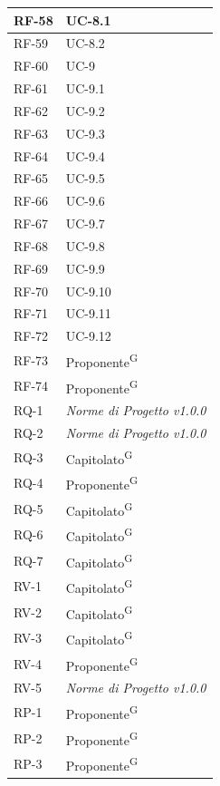 \documentclass[8pt]{article}
\newcommand{\glossterm}[1]{#1\textsuperscript{G}} %
\begin{document}
\begin{longtable}{|>{\centering\arraybackslash}p{4cm}|>{\centering\arraybackslash}p{4cm}|}
            RF-58 & UC-8.1 \\ \hline
            RF-59 & UC-8.2 \\ \hline
            RF-60 & UC-9 \\ \hline
            RF-61 & UC-9.1 \\ \hline
            RF-62 & UC-9.2 \\ \hline
            RF-63 & UC-9.3 \\ \hline
            RF-64 & UC-9.4 \\ \hline
            RF-65 & UC-9.5 \\ \hline
            RF-66 & UC-9.6 \\ \hline
            RF-67 & UC-9.7 \\ \hline
            RF-68 & UC-9.8 \\ \hline
            RF-69 & UC-9.9 \\ \hline
            RF-70 & UC-9.10 \\ \hline
            RF-71 & UC-9.11 \\ \hline
            RF-72 & UC-9.12 \\ \hline
            RF-73 & \glossterm{Proponente} \\ \hline
            RF-74 & \glossterm{Proponente} \\ \hline
            RQ-1 & \textit{Norme di Progetto v1.0.0} \\ \hline
            RQ-2 & \textit{Norme di Progetto v1.0.0} \\ \hline
            RQ-3 & \glossterm{Capitolato} \\ \hline
            RQ-4 & \glossterm{Proponente} \\ \hline
            RQ-5 & \glossterm{Capitolato} \\ \hline
            RQ-6 & \glossterm{Capitolato} \\ \hline
            RQ-7 & \glossterm{Capitolato} \\ \hline
            RV-1 & \glossterm{Capitolato} \\ \hline
            RV-2 & \glossterm{Capitolato} \\ \hline
            RV-3 & \glossterm{Capitolato} \\ \hline
            RV-4 & \glossterm{Proponente} \\ \hline
            RV-5 & \textit{Norme di Progetto v1.0.0} \\ \hline
            RP-1 & \glossterm{Proponente} \\ \hline
            RP-2 & \glossterm{Proponente} \\ \hline
            RP-3 & \glossterm{Proponente} \\ \hline
\end{longtable}
\end{document}
